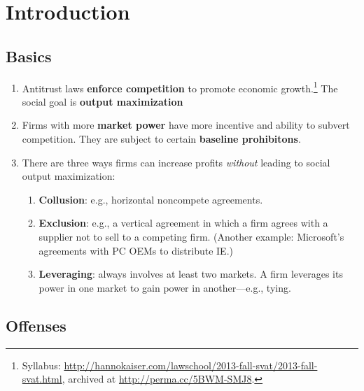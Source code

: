 \section{Introduction}

\subsection{Basics}

\begin{enumerate}
    \item Antitrust laws \textbf{enforce competition} to promote economic 
    growth.\footnote{Syllabus: 
    \url{http://hannokaiser.com/lawschool/2013-fall-svat/2013-fall-svat.html}, 
    archived at \url{http://perma.cc/5BWM-SMJ8}.} The social goal is 
    \textbf{output maximization}
    \item Firms with more \textbf{market power} have more incentive and ability 
    to subvert competition. They are subject to certain \textbf{baseline 
    prohibitons}.
    \item There are three ways firms can increase profits \emph{without} leading 
    to social output maximization:
    \begin{enumerate}
        \item \textbf{Collusion}: e.g., horizontal noncompete agreements.
        \item \textbf{Exclusion}: e.g., a vertical agreement in which a firm 
        agrees with a supplier not to sell to a competing firm. (Another 
        example: Microsoft's agreements with PC OEMs to distribute IE.)
        \item \textbf{Leveraging}: always involves at least two markets. A firm 
        leverages its power in one market to gain power in another---e.g., 
        tying.
    \end{enumerate}
\end{enumerate}

\subsection{Offenses}

